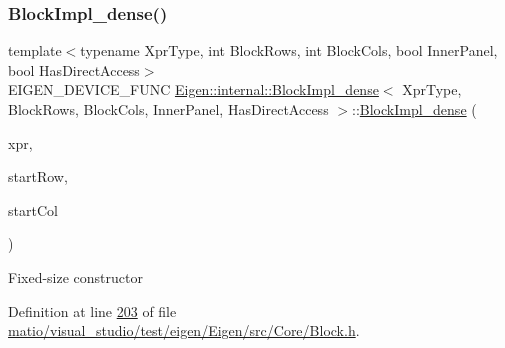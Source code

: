 \subsubsection{\texorpdfstring{Block\+Impl\+\_\+dense()}{BlockImpl\_dense()}\hspace{0.1cm}{\footnotesize\ttfamily [5/6]}}
{\footnotesize\ttfamily template$<$typename Xpr\+Type, int Block\+Rows, int Block\+Cols, bool Inner\+Panel, bool Has\+Direct\+Access$>$ \\
E\+I\+G\+E\+N\+\_\+\+D\+E\+V\+I\+C\+E\+\_\+\+F\+U\+NC \hyperlink{class_eigen_1_1internal_1_1_block_impl__dense}{Eigen\+::internal\+::\+Block\+Impl\+\_\+dense}$<$ Xpr\+Type, Block\+Rows, Block\+Cols, Inner\+Panel, Has\+Direct\+Access $>$\+::\hyperlink{class_eigen_1_1internal_1_1_block_impl__dense}{Block\+Impl\+\_\+dense} (\begin{DoxyParamCaption}\item[{Xpr\+Type \&}]{xpr,  }\item[{\hyperlink{namespace_eigen_a62e77e0933482dafde8fe197d9a2cfde}{Index}}]{start\+Row,  }\item[{\hyperlink{namespace_eigen_a62e77e0933482dafde8fe197d9a2cfde}{Index}}]{start\+Col }\end{DoxyParamCaption})\hspace{0.3cm}{\ttfamily [inline]}}

Fixed-\/size constructor 

Definition at line \hyperlink{matio_2visual__studio_2test_2eigen_2_eigen_2src_2_core_2_block_8h_source_l00203}{203} of file \hyperlink{matio_2visual__studio_2test_2eigen_2_eigen_2src_2_core_2_block_8h_source}{matio/visual\+\_\+studio/test/eigen/\+Eigen/src/\+Core/\+Block.\+h}.

\mbox{\label{class_eigen_1_1internal_1_1_block_impl__dense_a187c7918e6f200bf1d7d9a9c2f608547}} 
